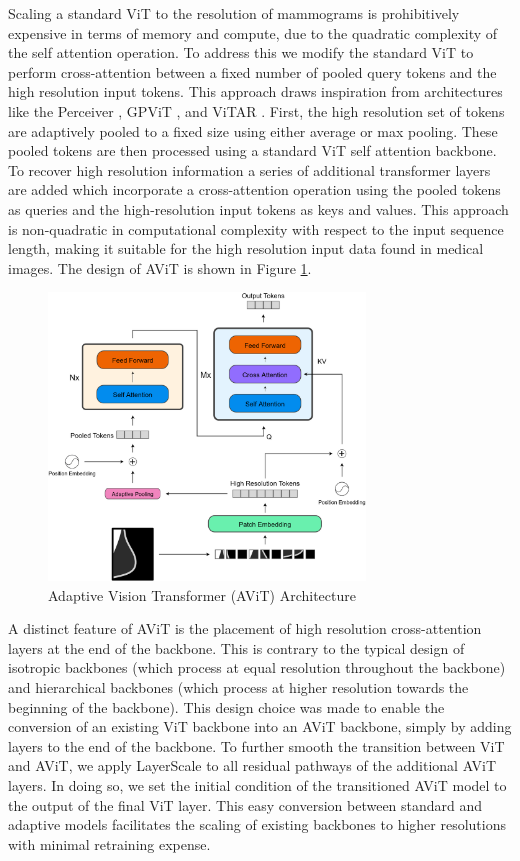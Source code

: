 \documentclass[12pt]{article}
\begin{document}
Scaling a standard ViT to the resolution of mammograms is prohibitively expensive in terms of memory and compute, due to the quadratic complexity of the self attention operation.
To address this we modify the standard ViT to perform cross-attention between a fixed number of pooled query tokens and the high resolution input tokens. This approach draws inspiration
from architectures like the Perceiver \cite{jaegle2021perceiver}, GPViT \cite{yang2023gpvit}, and ViTAR \cite{fan2024vitar}. First, the high resolution set of tokens are adaptively pooled to a
fixed size using either average or max pooling. These pooled tokens are then processed using a standard ViT self attention backbone. To recover high resolution information a series of
additional transformer layers are added which incorporate a cross-attention operation using the pooled tokens as queries and the high-resolution input tokens as keys and values. 
This approach is non-quadratic in computational complexity with respect to the input sequence length, making it suitable for the high resolution input data found in medical images.
The design of AViT is shown in Figure \ref{fig:avit}.

\begin{figure}[H]
    \centering
    \includegraphics[width=0.75\textwidth]{./figures/avit.png}
    \caption{Adaptive Vision Transformer (AViT) Architecture}
    \label{fig:avit}
\end{figure}

A distinct feature of AViT is the placement of high resolution cross-attention layers at the end of the backbone. This is contrary to the typical design of isotropic backbones 
(which process at equal resolution throughout the backbone) and hierarchical backbones (which process at higher resolution towards the beginning of the backbone). This design choice
was made to enable the conversion of an existing ViT backbone into an AViT backbone, simply by adding layers to the end of the backbone. 
To further smooth the transition between ViT and AViT, we apply LayerScale \cite{touvron2021deeper} to all residual pathways of the additional AViT layers. In doing so, we set the initial condition of the transitioned AViT model to the output of the final ViT layer.
This easy conversion between standard and adaptive
models facilitates the scaling of existing backbones to higher resolutions with minimal retraining expense.
\end{document}
